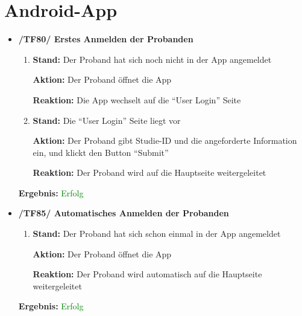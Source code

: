 \documentclass[a4paper]{scrreprt}
\begin{document}
	      \section{Android-App}
	
            \begin{itemize}

            \item \textbf{/TF80/ Erstes Anmelden der Probanden}
            \begin{enumerate}
                \item \par \textbf{Stand: }Der Proband hat sich noch nicht in der App angemeldet
                \par \textbf{Aktion: }Der Proband öffnet die App
                \par \textbf{Reaktion: }Die App wechselt auf die ``User Login'' Seite
                \item \par \textbf{Stand: }Die ``User Login'' Seite liegt vor
                \par \textbf{Aktion: }Der Proband gibt Studie-ID und die angeforderte Information ein, und klickt den Button ``Submit''
                \par \textbf{Reaktion: }Der Proband wird auf die Hauptseite weitergeleitet
            \end{enumerate}
					\vspace*{0.3cm}
		           \par \textbf{Ergebnis: }\textcolor{green}{Erfolg}
		           \vspace*{0.6cm}

	        \item \textbf{/TF85/ Automatisches Anmelden der Probanden}
	        \begin{enumerate}
	        	\item \par \textbf{Stand: }Der Proband hat sich schon einmal in der App angemeldet
	        	\par \textbf{Aktion: }Der Proband öffnet die App
	        	\par \textbf{Reaktion: }Der Proband wird automatisch auf die Hauptseite weitergeleitet
	        \end{enumerate}
					\vspace*{0.3cm}
		           \par \textbf{Ergebnis: }\textcolor{green}{Erfolg}
		           \vspace*{0.6cm} 	


\end{itemize}
\end{document}
